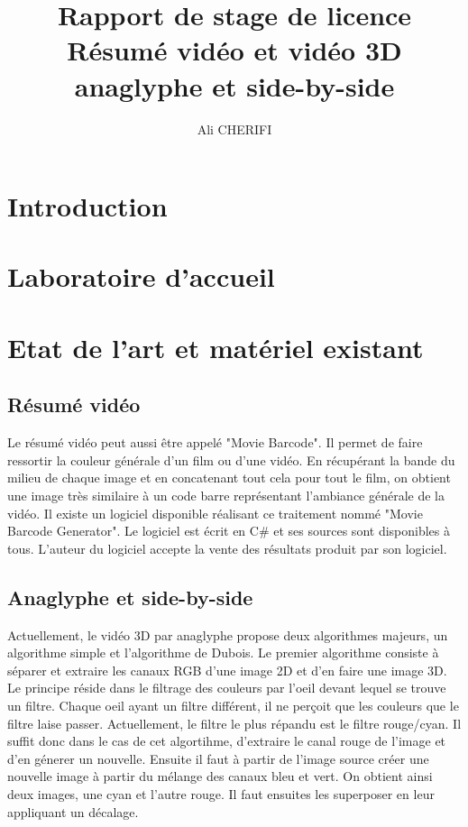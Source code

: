 \documentclass[10pt,a4paper]{article}
\author{Ali CHERIFI}
\title{Rapport de stage de licence\\Résumé vidéo et vidéo 3D anaglyphe et side-by-side}
\begin{document}
\maketitle
\newpage
\tableofcontents
\newpage
\section{Introduction}

\section{Laboratoire d'accueil}



\section{Etat de l'art et matériel existant}
\subsection{Résumé vidéo}
Le résumé vidéo peut aussi être appelé "Movie Barcode". Il permet de faire ressortir la couleur générale d'un film ou d'une vidéo. En récupérant la bande du milieu de chaque image et en concatenant tout cela pour
tout le film, on obtient une image très similaire à un code barre représentant l'ambiance générale de la vidéo.
Il existe un logiciel disponible réalisant ce traitement nommé "Movie Barcode Generator". Le logiciel est écrit en C\# et ses sources sont disponibles à tous. L'auteur du logiciel accepte la vente des
résultats produit par son logiciel.

\subsection{Anaglyphe et side-by-side}
Actuellement, le vidéo 3D par anaglyphe propose deux algorithmes majeurs, un algorithme simple et l'algorithme de Dubois.
Le premier algorithme consiste à séparer et extraire les canaux RGB d'une image 2D et d'en faire une image 3D. Le principe réside dans le filtrage des couleurs par l'oeil devant lequel se trouve un filtre.
Chaque oeil ayant un filtre différent, il ne perçoit que les couleurs que le filtre laise passer. Actuellement, le filtre le plus répandu est le filtre rouge/cyan.
Il suffit donc dans le cas de cet algortihme, d'extraire le canal rouge de l'image et d'en génerer un nouvelle. Ensuite il faut à partir de l'image source créer une nouvelle image à partir du mélange des canaux bleu et vert.
On obtient ainsi deux images, une cyan et l'autre rouge. Il faut ensuites les superposer en leur appliquant un décalage.\newline
\end{document}
